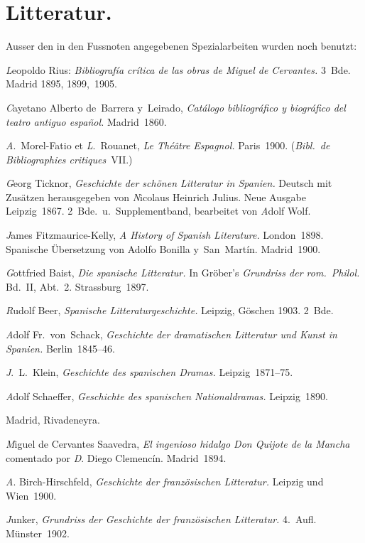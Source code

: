 \section{Litteratur.}

Ausser den in den Fussnoten angegebenen Spezialarbeiten wurden noch
benutzt:

{\emph Leopoldo Rius:} {\it\spanish Bibliografía crítica de las obras de Miguel de Cervantes.} 3~Bde.
Madrid 1895, 1899,~1905.

{\emph Cayetano Alberto de~Barrera y~Leirado,}
{\it\spanish Catálogo bibliográfico y biográfico del teatro antiguo español.}
Madrid~1860.

{\emph A.~Morel-Fatio} et {\emph L.~Rouanet,} {\it\french Le Théâtre Espagnol.}
Paris~1900. ({\it Bibl.\ de Bibliographies critiques}~VII.)

{\emph Georg Ticknor,} {\it Geschichte der schönen Litteratur in Spanien.} Deutsch mit
Zusätzen herausgegeben von {\emph Nicolaus Heinrich Julius}. Neue Ausgabe
Leipzig~1867. 2~Bde.\ u.~Supplementband, bearbeitet von {\emph Adolf Wolf}.

{\emph James Fitzmaurice-Kelly,} {\it\english A History of Spanish Literature.} London~1898.
Spanische Übersetzung von Adolfo Bonilla y~San~Martín. Madrid~1900.

{\emph Gottfried Baist,} {\it Die spanische Litteratur.} In Gröber's {\it Grundriss der
rom.\ Philol.} Bd.~II, Abt.~2. Strassburg~1897.

{\emph Rudolf Beer,} {\it Spanische Litteraturgeschichte.} Leipzig, Göschen 1903. 2~Bde.

{\emph Adolf Fr.~von~Schack,} {\it Geschichte der dramatischen Litteratur und Kunst in
Spanien.} Berlin~1845--46.

{\emph J.~L.~Klein,} {\it Geschichte des spanischen Dramas.} Leipzig~1871--75.

{\emph Adolf Schaeffer,} {\it Geschichte des spanischen Nationaldramas.} Leipzig~1890.

{ Madrid, Rivadeneyra.}

{\emph Miguel de Cervantes Saavedra,} {\it\spanish El ingenioso hidalgo Don Quijote de la
Mancha} comentado por {\emph D. Diego Clemencín.} Madrid~1894.

{\emph A. Birch-Hirschfeld,} {\it Geschichte der französischen Litteratur.} Leipzig und
Wien~1900.

{\emph Junker,} {\it Grundriss der Geschichte der französischen Litteratur.} 4.~Aufl. Münster~1902.

